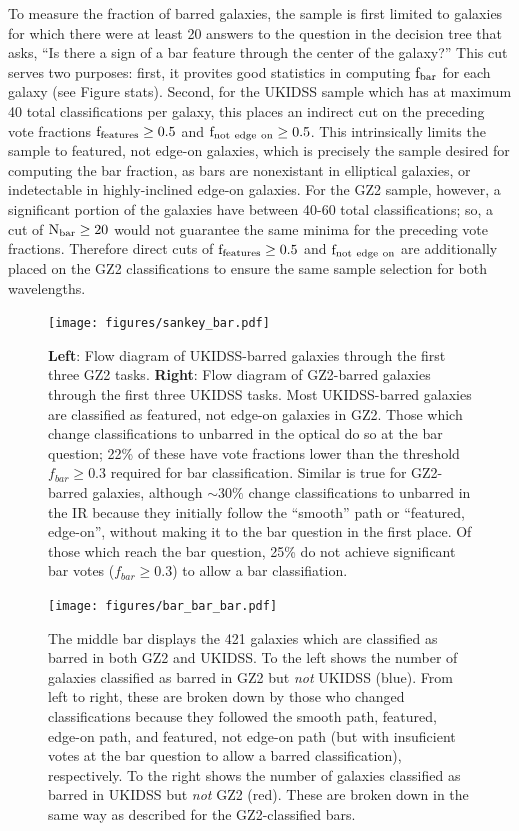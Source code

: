 To measure the fraction of barred galaxies, the sample is first limited to galaxies for which there were at least 20 answers to the question in the decision tree that asks, ``Is there a sign of a bar feature through the center of the galaxy?'' This cut serves two purposes: first, it provites good statistics in computing $\rm f_{bar}$ for each galaxy (see Figure stats). Second, for the UKIDSS sample which has at maximum 40 total classifications per galaxy, this places an indirect cut on the preceding vote fractions $\rm f_{features} \ge 0.5$ and $\rm f_{not~edge~on} \ge 0.5$. This intrinsically limits the sample to featured, not edge-on galaxies, which is precisely the sample desired for computing the bar fraction, as bars are nonexistant in elliptical galaxies, or indetectable in highly-inclined edge-on galaxies. For the GZ2 sample, however, a significant portion of the galaxies have between 40-60 total classifications; so, a cut of $\rm N_{bar} \ge 20$ would not guarantee the same minima for the preceding vote fractions. Therefore direct cuts of $\rm f_{features} \ge 0.5$ and $\rm f_{not~edge~on}$ are additionally placed on the GZ2 classifications to ensure the same sample selection for both wavelengths.  


\begin{figure}
\centering
\texttt{[image: figures/sankey\_bar.pdf]}
\caption{\textbf{Left}: Flow diagram of UKIDSS-barred galaxies through the first three GZ2 tasks. \textbf{Right}: Flow diagram of GZ2-barred galaxies through the first three UKIDSS tasks. Most UKIDSS-barred galaxies are classified as featured, not edge-on galaxies in GZ2. Those which change classifications to unbarred in the optical do so at the bar question; 22\% of these have vote fractions lower than the threshold $f_{bar}\ge0.3$ required for bar classification.  Similar is true for GZ2-barred galaxies, although $\sim30\%$ change classifications to unbarred in the IR because they initially follow the ``smooth'' path or ``featured, edge-on'', without making it to the bar question in the first place. Of those which reach the bar question, 25\% do not achieve significant bar votes ($f_{bar}\ge0.3$) to allow a bar classifiation.  }
\label{fig:sankeybar}
\end{figure}

\begin{figure}
\centering
\texttt{[image: figures/bar\_bar\_bar.pdf]}
\caption{The middle bar displays the 421 galaxies which are classified as barred in both GZ2 and UKIDSS. To the left shows the number of galaxies classified as barred in GZ2 but \emph{not} UKIDSS (blue). From left to right, these are broken down by those who changed classifications because they followed the smooth path, featured, edge-on path, and featured, not edge-on path (but with insuficient votes at the bar question to allow a barred classification), respectively. To the right shows the number of galaxies classified as barred in UKIDSS but \emph{not} GZ2 (red). These are broken down in the same way as described for the GZ2-classified bars. }
\label{fig:barbarbar}
\end{figure}

